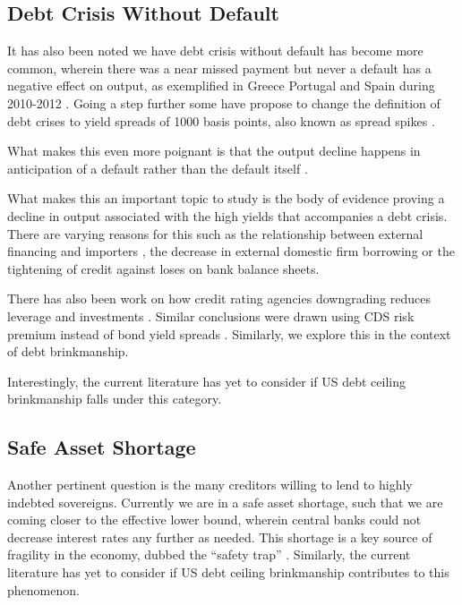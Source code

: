 \documentclass[
  12pt]{article}
\begin{document}
\hypertarget{debt-crisis-without-default}{%
\subsection{Debt Crisis Without
Default}\label{debt-crisis-without-default}}

It has also been noted we have debt crisis without default has become
more common, wherein there was a near missed payment but never a default
has a negative effect on output, as exemplified in Greece Portugal and
Spain during 2010-2012 \citep{mitchener2023} . Going a step further some
have propose to change the definition of debt crises to yield spreads of
1000 basis points, also known as spread spikes
\citep{broner2013, aguiar, krishnamurthy}.

What makes this even more poignant is that the output decline happens in
anticipation of a default rather than the default itself
\citep{yeyati2011}.

What makes this an important topic to study is the body of evidence
proving a decline in output associated with the high yields that
accompanies a debt crisis. There are varying reasons for this such as
the relationship between external financing and importers
\citep{mendoza2012}, the decrease in external domestic firm
borrowing\citep{corsetti2012, das2010, gourinchas2016} or the tightening
of credit against loses on bank balance
sheets\citep{arellano, ferrando2017}.

There has also been work on how credit rating agencies downgrading
reduces leverage and investments \citep{almeida2017}. Similar
conclusions were drawn using CDS risk premium instead of bond yield
spreads \citep{brutti2015, bahaj2020}. Similarly, we explore this in the
context of debt brinkmanship.

Interestingly, the current literature has yet to consider if US debt
ceiling brinkmanship falls under this category.

\hypertarget{safe-asset-shortage}{%
\subsection{Safe Asset Shortage}\label{safe-asset-shortage}}

Another pertinent question is the many creditors willing to lend to
highly indebted sovereigns. Currently we are in a safe asset shortage,
such that we are coming closer to the effective lower bound, wherein
central banks could not decrease interest rates any further as needed.
This shortage is a key source of fragility in the economy, dubbed the
``safety trap'' \citep{caballero2017} . Similarly, the current
literature has yet to consider if US debt ceiling brinkmanship
contributes to this phenomenon.
\end{document}

